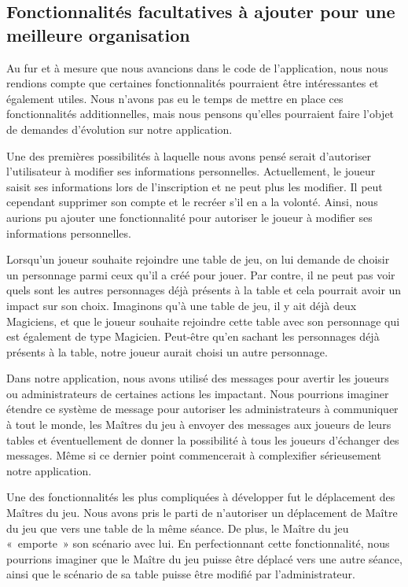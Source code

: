 \documentclass[11pt]{article}
\begin{document}
\subsection{Fonctionnalités facultatives à ajouter pour une meilleure organisation}

Au fur et à mesure que nous avancions dans le code de l'application, nous nous rendions compte que certaines fonctionnalités pourraient être intéressantes et également utiles. Nous n'avons pas eu le temps de mettre en place ces fonctionnalités additionnelles, mais nous pensons qu'elles pourraient faire l'objet de demandes d'évolution sur notre application.

\bigbreak

Une des premières possibilités à laquelle nous avons pensé serait d'autoriser l'utilisateur à modifier ses informations personnelles. Actuellement, le joueur saisit ses informations lors de l'inscription et ne peut plus les modifier. Il peut cependant supprimer son compte et le recréer s'il en a la volonté. Ainsi, nous aurions pu ajouter une fonctionnalité pour autoriser le joueur à modifier ses informations personnelles.

\bigbreak

Lorsqu'un joueur souhaite rejoindre une table de jeu, on lui demande de choisir un personnage parmi ceux qu'il a créé pour jouer. Par contre, il ne peut pas voir quels sont les autres personnages déjà présents à la table et cela pourrait avoir un impact sur son choix. Imaginons qu'à une table de jeu, il y ait déjà deux Magiciens, et que le joueur souhaite rejoindre cette table avec son personnage qui est également de type Magicien. Peut-être qu'en sachant les personnages déjà présents à la table, notre joueur aurait choisi un autre personnage.

\bigbreak

Dans notre application, nous avons utilisé des messages pour avertir les joueurs ou administrateurs de certaines actions les impactant. Nous pourrions imaginer étendre ce système de message pour autoriser les administrateurs à communiquer à tout le monde, les Maîtres du jeu à envoyer des messages aux joueurs de leurs tables et éventuellement de donner la possibilité à tous les joueurs d'échanger des messages. Même si ce dernier point commencerait à complexifier sérieusement notre application.

\bigbreak

Une des fonctionnalités les plus compliquées à développer fut le déplacement des Maîtres du jeu. Nous avons pris le parti de n'autoriser un déplacement de Maître du jeu que vers une table de la même séance. De plus, le Maître du jeu «~emporte~» son scénario avec lui. En perfectionnant cette fonctionnalité, nous pourrions imaginer que le Maître du jeu puisse être déplacé vers une autre séance, ainsi que le scénario de sa table puisse être modifié par l'administrateur.
\end{document}
